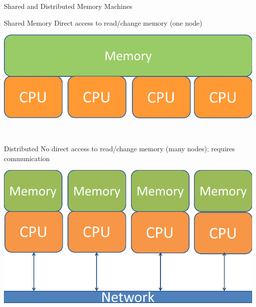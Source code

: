 \begin{frame}
  \begin{block}{Shared and Distributed Memory Machines}
   \begin{center}
    \begin{minipage}{.475\textwidth}
    \begin{block}{Shared Memory}
     Direct access to read/change memory (one node) \vspace{.3cm} \ 
      \begin{center}
      \includegraphics[width=.95\textwidth]{../common/pics/arch_shared}
      \end{center}
      \vspace{.3cm} \
    \end{block}
    \end{minipage}
    \hspace{.1cm}
    \begin{minipage}{.475\textwidth}
    \begin{block}{Distributed}
    No direct access to read/change memory (many nodes); requires communication
      \begin{center}
      \includegraphics[width=.95\textwidth]{../common/pics/arch_distributed}
      \end{center}
    \end{block}
    \end{minipage}
    \end{center}
    \end{block}
\end{frame}


